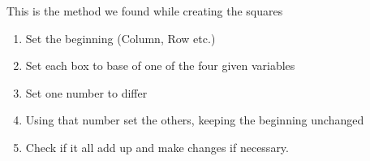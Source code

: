 \documentclass{article}
\begin{document}
        This is the method we found while creating the squares
        
        \begin{enumerate}
            \item Set the beginning (Column, Row etc.) 
            \item Set each box to base of one of the four given variables 
            \item Set one number to differ
            \item Using that number set the others, keeping the beginning unchanged
            \item Check if it all add up and make changes if necessary.
        \end{enumerate}
\end{document}
